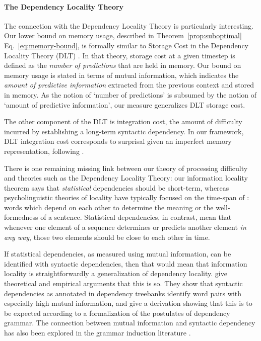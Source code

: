 \paragraph{The Dependency Locality Theory}
The connection with the Dependency Locality Theory is particularly interesting.
Our lower bound on memory usage, described in Theorem~\ref{prop:suboptimal} Eq.~\ref{eq:memory-bound}, is formally similar to Storage Cost in the Dependency Locality Theory (DLT) \citep{gibson-linguistic-1998,gibson2000dependency}.
In that theory, storage cost at a given timestep is defined as the \emph{number of predictions} that are held in memory.
Our bound on memory usage is stated in terms of mutual information, which indicates the \emph{amount of predictive information} extracted from the previous context and stored in memory.
As the notion of `number of predictions' is subsumed by the notion of `amount of predictive information', our measure generalizes DLT storage cost. 


The other component of the DLT is integration cost, the amount of difficulty incurred by establishing a long-term syntactic dependency. 
In our framework, DLT integration cost corresponds to surprisal given an imperfect memory representation, following \cite{futrell2020lossy}.

There is one remaining missing link between our theory of processing difficulty and theories such as the Dependency Locality Theory:
our information locality theorem says that \emph{statistical} dependencies should be short-term, whereas psycholinguistic theories of locality have typically focused on the time-span of : words which depend on each other to determine the meaning or the well-formedness of a sentence. Statistical dependencies, in contrast, mean that whenever one element of a sequence determines or predicts another element \emph{in any way}, those two elements should be close to each other in time. 

If statistical dependencies, as measured using mutual information, can be identified with syntactic dependencies, then that would mean that information locality is straightforwardly a generalization of dependency locality. \citet{futrell2019syntactic} give theoretical and empirical arguments that this is so. They show that syntactic dependencies as annotated in dependency treebanks identify word pairs with especially high mutual information, and give a derivation showing that this is to be expected according to a formalization of the postulates of dependency grammar. The connection between mutual information and syntactic dependency has also been explored in the grammar induction literature \citep{de1996selection,yuret1998discovery}. %





